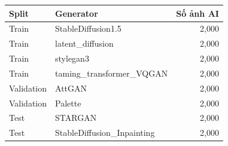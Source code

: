 \begin{tabular}{llr}
\toprule
Split & Generator & Số ảnh AI \\
\midrule
Train & StableDiffusion1.5 & 2,000 \\
Train & latent\_diffusion & 2,000 \\
Train & stylegan3 & 2,000 \\
Train & taming\_transformer\_VQGAN & 2,000 \\
Validation & AttGAN & 2,000 \\
Validation & Palette & 2,000 \\
Test & STARGAN & 2,000 \\
Test & StableDiffusion\_Inpainting & 2,000 \\
\bottomrule
\end{tabular}
